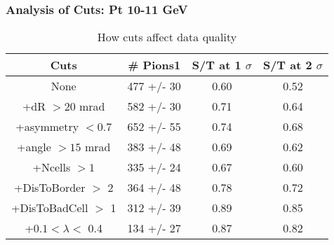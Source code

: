 \frame
{
\frametitle{Analysis of Cuts: Pt 10-11 GeV}
\begin{table}
\caption{How cuts affect data quality}
\centering
\begin{tabular}{c c c c}
\hline\hline
Cuts & \# Pions1 & S/T at 1 $\sigma$ & S/T at 2 $\sigma$ \\ [0.5ex]
\hline
None &  477 +/-   30 & 0.60 & 0.52 \\ %
+dR $> 20$ mrad &  582 +/-   30 & 0.71 & 0.64 \\ %
+asymmetry $< 0.7$ &  652 +/-   55 & 0.74 & 0.68 \\ %
+angle $> 15$ mrad &  383 +/-   48 & 0.69 & 0.62 \\ %
+Ncells $> 1$&  335 +/-   24 & 0.67 & 0.60 \\ %
+DisToBorder $>$ 2 &  364 +/-   48 & 0.78 & 0.72 \\ %
+DisToBadCell $>$ 1&  312 +/-   39 & 0.89 & 0.85 \\ %
+$0.1 < \lambda <$ 0.4 &  134 +/-   27 & 0.87 & 0.82 \\ %
[1ex]
\hline
\end{tabular}
\label{table:nonlin}
\end{table}
}
